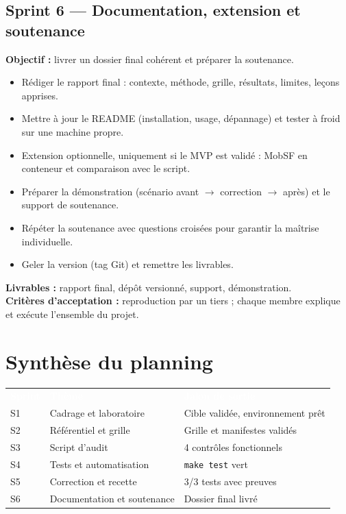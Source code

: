 \documentclass[11pt,a4paper]{article}
\newcommand{\code}[1]{{\NoAutoSpacing\texttt{\small #1}}}
\newcommand{\code}[1]{{\texttt{\small #1}}}
\newcommand{\hd}[1]{\textcolor{white}{\textbf{#1}}}
\begin{document}
\subsection{Sprint 6 --- Documentation, extension et soutenance}
\textbf{Objectif :} livrer un dossier final cohérent et préparer la soutenance.
\begin{itemize}
  \item Rédiger le rapport final : contexte, méthode, grille, résultats, limites, leçons apprises.
  \item Mettre à jour le README (installation, usage, dépannage) et tester à froid sur une machine propre.
  \item Extension optionnelle, uniquement si le MVP est validé : MobSF en conteneur et comparaison avec le script.
  \item Préparer la démonstration (scénario avant $\rightarrow$ correction $\rightarrow$ après) et le support de soutenance.
  \item Répéter la soutenance avec questions croisées pour garantir la maîtrise individuelle.
  \item Geler la version (tag Git) et remettre les livrables.
\end{itemize}
\textbf{Livrables :} rapport final, dépôt versionné, support, démonstration.\\
\textbf{Critères d'acceptation :} reproduction par un tiers ; chaque membre explique et exécute l'ensemble du projet.

\section{Synthèse du planning}
\begin{center}
\begin{tabular}{L{1.6cm}L{6cm}L{6.6cm}}
\hd{Sprint} & \hd{Thème} & \hd{Jalon de sortie}\\
S1 & Cadrage et laboratoire & Cible validée, environnement prêt\\
S2 & Référentiel et grille & Grille et manifestes validés\\
S3 & Script d'audit & 4 contrôles fonctionnels\\
S4 & Tests et automatisation & \code{make test} vert\\
S5 & Correction et recette & 3/3 tests avec preuves\\
S6 & Documentation et soutenance & Dossier final livré\\
\end{tabular}
\end{center}
\end{document}
